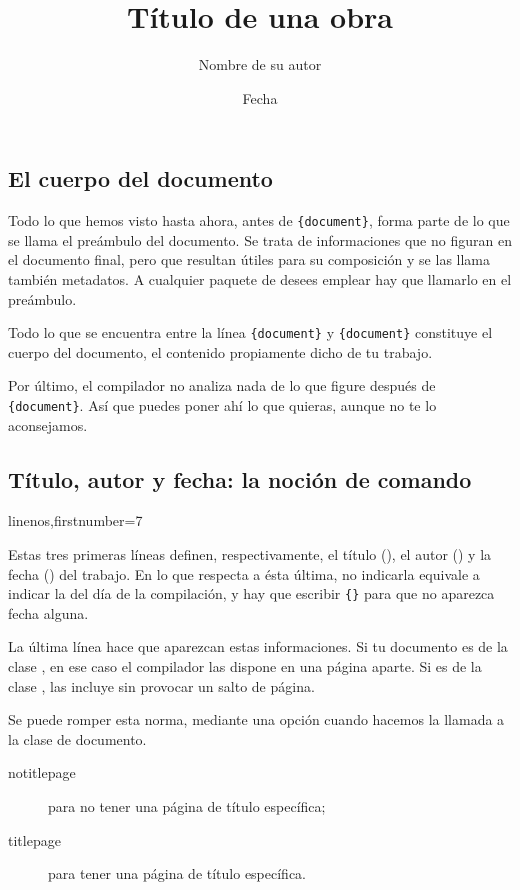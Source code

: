 \subsection{El cuerpo del documento}

Todo lo que hemos visto hasta ahora, antes de \verb|{document}|, forma parte de lo que se llama el preámbulo del documento.\label{preambule} Se trata de informaciones que no figuran en el documento final, pero que resultan útiles para su composición y se las llama también metadatos. A cualquier paquete de desees emplear hay que llamarlo en el preámbulo.

Todo lo que se encuentra entre la línea \verb|{document}| y \verb|{document}| constituye el cuerpo del documento, el contenido propiamente dicho de tu trabajo.

Por último, el compilador no analiza nada de lo que figure después de \verb|{document}|. Así que puedes poner ahí lo que quieras, aunque no te lo aconsejamos.

\subsection{Título, autor y fecha: la noción de comando}\label{notioncommande}

\begin{latexcode*}{linenos,firstnumber=7}
\title{Título de una obra}
\author{Nombre de su autor}
\date{Fecha}
\maketitle
\end{latexcode*}

Estas tres primeras líneas definen, respectivamente, el título (), el autor () y la fecha () del trabajo. En lo que respecta a ésta última, no indicarla equivale a indicar la del día de la compilación, y hay que escribir \verb|{}| para que no aparezca fecha alguna.

La última línea hace que aparezcan estas informaciones. Si tu documento es de la clase , en ese caso el compilador las dispone en una página aparte. Si es de la clase , las incluye sin provocar un salto de página.

Se puede romper esta norma, mediante una opción cuando hacemos la llamada a la clase de documento.
\begin{description}
\item[notitlepage] para no tener una página de título específica;
\item[titlepage] para tener una página de título específica.
\end{description}

